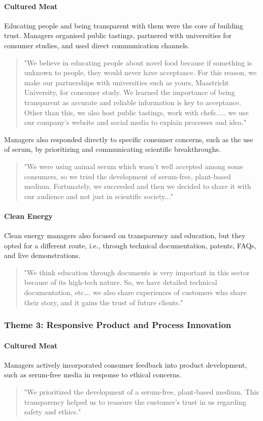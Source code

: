 \paragraph{Cultured Meat}
Educating people and being transparent with them were the core of building trust. Managers organised public tastings, partnered with universities for consumer studies, and used direct communication channels.
\begin{quote}
	"We believe in educating people about novel food because if something is unknown to people, they would never have acceptance. For this reason, we make our partnerships with universities such as yours, Maastricht University, for consumer study. We learned the importance of being transparent as accurate and reliable information is key to acceptance. Other than this, we also host public tastings, work with chefs..... we use our company's website and social media to explain processes and idea."
\end{quote}
Managers also responded directly to specific consumer concerns, such as the use of serum, by prioritizing and communicating scientific breakthroughs.
\begin{quote}
	"We were using animal serum which wasn't well accepted among some consumers, so we tried the development of serum-free, plant-based medium. Fortunately, we succeeded and then we decided to share it with our audience and not just in scientific society..."
\end{quote}

\paragraph{Clean Energy}
Clean energy managers also focused on transparency and education, but they opted for a different route, i.e., through technical documentation, patents, FAQs, and live demonstrations.
\begin{quote}
	"We think education through documents is very important in this sector because of its high-tech nature. So, we have detailed technical documentation, etc…. we also share experiences of customers who share their story, and it gains the trust of future clients."
\end{quote}

\subsubsection{Theme 3: Responsive Product and Process Innovation}
\paragraph{Cultured Meat}
Managers actively incorporated consumer feedback into product development, such as serum-free media in response to ethical concerns.
\begin{quote}
	"We prioritized the development of a serum-free, plant-based medium. This transparency helped us to reassure the customer's trust in us regarding safety and ethics."
\end{quote}

